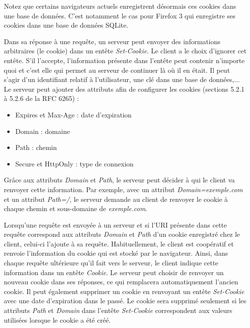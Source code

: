 Notez que certains navigateurs actuels enregistrent désormais ces cookies dans une base de données. C'est notamment le cas pour Firefox 3 qui enregistre ses cookies dans une base de données SQLite.
\newline

Dans sa réponse à une requête, un serveur peut envoyer des informations arbitraires (le cookie) dans un entête \textit{Set-Cookie}. Le client a le choix d'ignorer cet entête. S'il l'accepte, l'information présente dans l'entête peut contenir n'importe quoi et c'est elle qui permet au serveur de continuer là où il en était. Il peut s'agir d'un identifiant relatif à l'utilisateur, une clé dans une base de données,...
Le serveur peut ajouter des attributs afin de configurer les cookies (sections 5.2.1 à 5.2.6 de la RFC 6265) \cite{IETF_RFC6265} :

\begin{itemize}
	\item Expires et Max-Age : date d'expiration
	\item Domain : domaine
	\item Path : chemin
	\item Secure et HttpOnly : type de connexion
	\newline
\end{itemize}

Grâce aux attributs \textit{Domain} et \textit{Path}, le serveur peut décider à qui le client va renvoyer cette information. Par exemple, avec un attribut \textit{Domain=exemple.com} et un attribut \textit{Path=/}, le serveur demande au client de renvoyer le cookie à chaque chemin et sous-domaine de \textit{exemple.com}.
\newline

Lorsqu'une requête est envoyée à un serveur et si l'URI présente dans cette requête correspond aux attributs \textit{Domain} et \textit{Path} d'un cookie enregistré chez le client, celui-ci l'ajoute à sa requête.
Habituellement, le client est coopératif et renvoie l'information du cookie qui est stocké par le navigateur. Ainsi, dans chaque requête ultérieure qu'il fait vers le serveur, le client indique cette information dans un entête \textit{Cookie}. Le serveur peut choisir de renvoyer un nouveau cookie dans ses réponses, ce qui remplacera automatiquement l'ancien cookie. Il peut également supprimer un cookie en renvoyant un entête \textit{Set-Cookie} avec une date d'expiration dans le passé. Le cookie sera supprimé seulement si les attributs \textit{Path} et \textit{Domain} dans l'entête \textit{Set-Cookie} correspondent aux valeurs utilisées lorsque le cookie a été créé.
\newline

